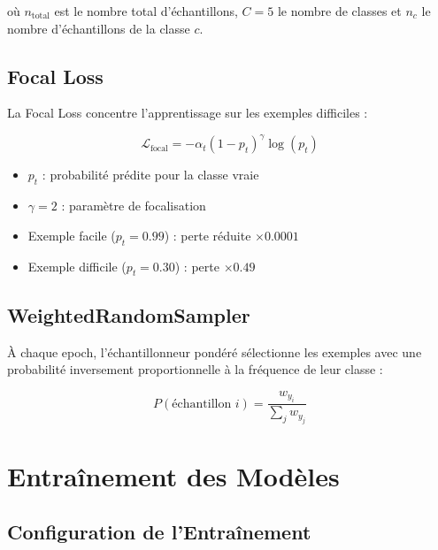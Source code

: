\documentclass[12pt,a4paper,oneside]{report}
\begin{document}
où $n_{\text{total}}$ est le nombre total d'échantillons, $C = 5$ le nombre
de classes et $n_c$ le nombre d'échantillons de la classe $c$.

\subsection{Focal Loss}

La Focal Loss concentre l'apprentissage sur les exemples difficiles :

\begin{equation}
\mathcal{L}_{\text{focal}} = -\alpha_t (1 - p_t)^\gamma \log(p_t)
\label{eq:focal_loss}
\end{equation}

\begin{itemize}
    \item $p_t$ : probabilité prédite pour la classe vraie
    \item $\gamma = 2$ : paramètre de focalisation
    \item Exemple facile ($p_t = 0.99$) : perte réduite $\times 0.0001$
    \item Exemple difficile ($p_t = 0.30$) : perte $\times 0.49$
\end{itemize}

\subsection{WeightedRandomSampler}

À chaque epoch, l'échantillonneur pondéré sélectionne les exemples
avec une probabilité inversement proportionnelle à la fréquence de
leur classe :

\begin{equation}
P(\text{échantillon } i) = \frac{w_{y_i}}{\sum_j w_{y_j}}
\label{eq:sampler}
\end{equation}

\section{Entraînement des Modèles}

\subsection{Configuration de l'Entraînement}
\end{document}
